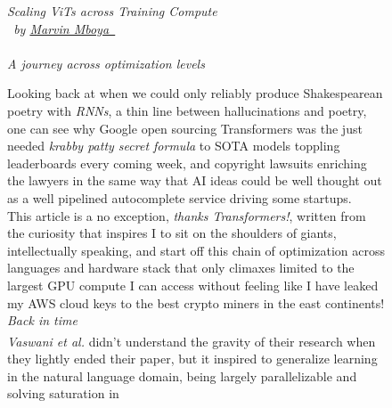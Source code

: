 \documentclass[12pt]{article}
\newcommand{\sidecite}[1]{\textsuperscript{\textcolor{blue}{\textbf{\scriptsize#1}}}}
\newcommand{\maincitecount}{\sidecite{\stepcounter{maincite}\themaincite}}
\begin{document}

\linespread{1.2}\selectfont
\author{Marvin}
\date{\today}


\begin{figure}[!htb]
    \begin{minipage}[t]{0.65\textwidth}
    {\sffamily 
    \fontsize{21}{8}\textcolor{xtitle}{\textit{Scaling ViTs across Training Compute}}\\
    \fontsize{9}{8}\textcolor{xtitle}{
        \textit{
            \ by \href{https://www.linkedin.com/in/marvin-mboya}{Marvin Mboya\ \faLinkedinSquare}
    }}\\
    }\\
    [-0.3cm]
    \textcolor{xtitle}{{\it A journey across optimization levels}}\\
    [0.2cm]
    \normalsize
    \raggedright
    Looking back at when we could only reliably produce Shakespearean poetry with {\it RNNs}, a thin line between hallucinations 
    and poetry, one can see why Google open sourcing Transformers was the just needed {\it krabby patty secret formula} to SOTA 
    models toppling leaderboards every coming week, and copyright lawsuits enriching the lawyers in the same way that AI ideas 
    could be well thought out as a well pipelined autocomplete service driving some startups.\\ 
    This article is a no exception, {\it thanks Transformers!}, written from the curiosity that inspires I to 
    sit on the shoulders of giants, intellectually speaking, and start off this chain of optimization across languages and hardware 
    stack that only climaxes limited to the largest GPU compute I can access without feeling like I have leaked my AWS cloud keys 
    to the best crypto miners in the east continents!
    \vspace{1.5em}\\
    \fontsize{14}{8}\textcolor{xtitle}{\textit{Back in time}}\\
    {\it Vaswani et al.} didn't understand the gravity of their research{\maincitecount} when they lightly ended their paper, but 
    it inspired to generalize learning in the natural language domain, being largely parallelizable and solving saturation in 

\end{minipage}
\end{figure}
\end{document}
